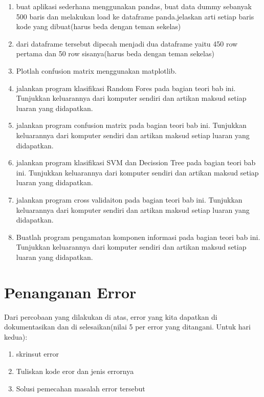 \begin{enumerate}
\item buat aplikasi sederhana menggunakan pandas, buat data dummy sebanyak 500 baris dan melakukan load ke dataframe panda.jelaskan arti setiap baris kode yang dibuat(harus beda dengan teman sekelas)
\item dari dataframe tersebut dipecah menjadi dua dataframe yaitu 450 row pertama dan 50 row sisanya(harus beda dengan teman sekelas)
\item Plotlah confusion matrix menggunakan matplotlib.
\item jalankan program klasifikasi Random Fores pada bagian teori bab ini. Tunjukkan keluarannya dari komputer sendiri dan artikan maksud setiap luaran yang didapatkan.
\item jalankan program confusion matrix pada bagian teori bab ini. Tunjukkan keluarannya dari komputer sendiri dan artikan maksud setiap luaran yang didapatkan.
\item jalankan program klasifikasi SVM dan Decission Tree pada bagian teori bab ini. Tunjukkan keluarannya dari komputer sendiri dan artikan maksud setiap luaran yang didapatkan.
\item jalankan program cross validaiton pada bagian teori bab ini. Tunjukkan keluarannya dari komputer sendiri dan artikan maksud setiap luaran yang didapatkan.
\item Buatlah program pengamatan komponen informasi pada bagian teori bab ini. Tunjukkan keluarannya dari komputer sendiri dan artikan maksud setiap luaran yang didapatkan.
\end{enumerate}


\section{Penanganan Error}
Dari percobaan yang dilakukan di atas, error yang kita dapatkan di dokumentasikan dan di selesaikan(nilai 5 per error yang ditangani. Untuk hari kedua):

\begin{enumerate}
	\item skrinsut error
	\item Tuliskan kode eror dan jenis errornya
	\item Solusi pemecahan masalah error tersebut
\end{enumerate}

